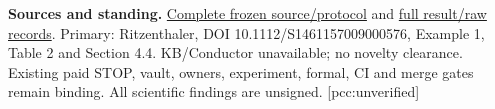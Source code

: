 \documentclass[10pt,a4paper]{article}
\begin{document}
\textbf{Sources and standing.}
\href{https://github.com/isogeny-labs/crypto/tree/0b9b506bc035d8ada6a111702b2ae3145e65deb6/research/chained_genus3_quartic_20261123/cm19_f7}{Complete frozen source/protocol}
and
\href{https://github.com/isogeny-labs/crypto/tree/89d7b471a53c564f9e0368a83315d5acbdd23218/research/chained_genus3_quartic_20261123/cm19_f7}{full result/raw records}.
Primary: Ritzenthaler, DOI 10.1112/S1461157009000576, Example 1,
Table 2 and Section 4.4. KB/Conductor unavailable; no novelty clearance.
Existing paid STOP, vault, owners, experiment, formal, CI and merge gates
remain binding. All scientific findings are unsigned. [pcc:unverified]
\end{document}
